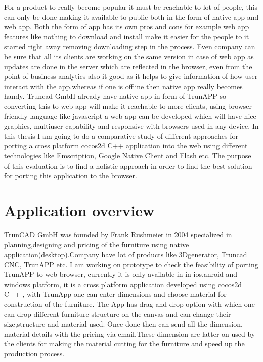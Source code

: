\documentclass[23pt]{article}
\begin{document}
{\Large For a product to really become popular it must be reachable to lot of people, this can only be done making it available to public both in the form of native app and web app. Both the form of app has its own pros and cons for example web app features like nothing to download and install make it easier for the people to it started right away removing downloading step in the process. Even company can be sure that all its clients are working on the same version in case of web app as updates are done in the server which are reflected in the browser, even from the point of business analytics also it good as it helps to give information of how user interact with the app.whereas if one is offline then native app really becomes handy. Truncad GmbH already have native app in form of TrunAPP so converting this to web app will make it reachable to more clients, using browser friendly language like javascript a web app can be developed which will have nice graphics, multiuser capability and  responsive with browsers used in any device. In this thesis I am going to do a comparative study of different approaches for porting a cross platform cocos2d C++ application into the web  using different technologies like Emscription, Google Native Client and Flash etc. The purpose of this evaluation is to find a holistic approach in order to find the best solution for porting this application to the browser.
 \par}

\newpage

\section{Application overview}

{\Large TrunCAD GmbH was founded by Frank Rushmeier in 2004 specialized in planning,designing and pricing of the furniture using native application(desktop).Company have lot of products like 3Dgenerator, Truncad CNC, TrunAPP etc. I  am working on prototype to check the feasibility of porting TrunAPP to web browser, currently it is only available in in ios,anroid and windows platform, it is a cross platform application developed using cocos2d C++ , with TrunApp one can enter dimensions and choose material for construction of the furniture. The App  has drag and drop option with which one can drop different furniture structure on the canvas and can change their size,structure and material used. Once done then can send all the dimension, material details with the pricing via email.These dimension are latter on used by the clients for making the material cutting for the furniture and speed up the production process. \par}
\end{document}
